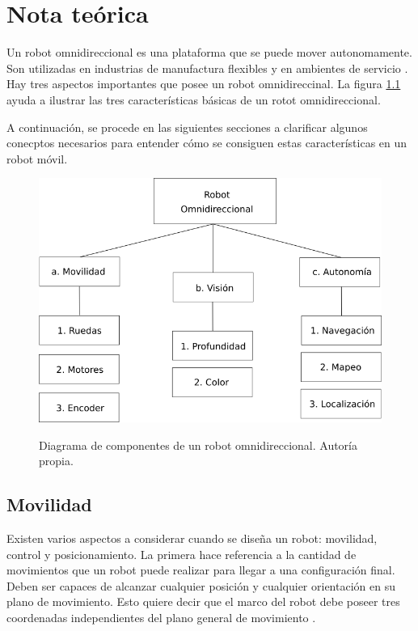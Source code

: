 \chapter{Nota teórica} 
\label{C:nota_teorica}

Un robot omnidireccional es una plataforma que se puede mover autonomamente. Son utilizadas en industrias de manufactura flexibles y en ambientes de servicio \cite{Batlle2009}. Hay tres aspectos importantes que posee un robot omnidireccinal. La figura \ref{fig:robot_omnidireccional} ayuda a ilustrar las tres características básicas de un rotot omnidireccional.

A continuación, se procede en las siguientes secciones a clarificar algunos conecptos necesarios para entender cómo se consiguen estas características en un robot móvil.

\begin{figure}[H]
  \centering
  \includegraphics[scale=0.6]{imagenes/robot_omnidireccional.png}
  \label{fig:robot_omnidireccional}
  \caption{Diagrama de componentes de un robot omnidireccional. Autoría propia.}
\end{figure}


\section{Movilidad}
Existen varios aspectos a considerar cuando se diseña un robot: movilidad, control y posicionamiento. La primera hace referencia a la cantidad de movimientos que un robot puede realizar para llegar a una configuración final. Deben ser capaces de alcanzar cualquier posición y cualquier orientación en su plano de movimiento. Esto quiere decir que el marco del robot debe poseer tres coordenadas independientes del plano general de movimiento \cite{Batlle2009}.

